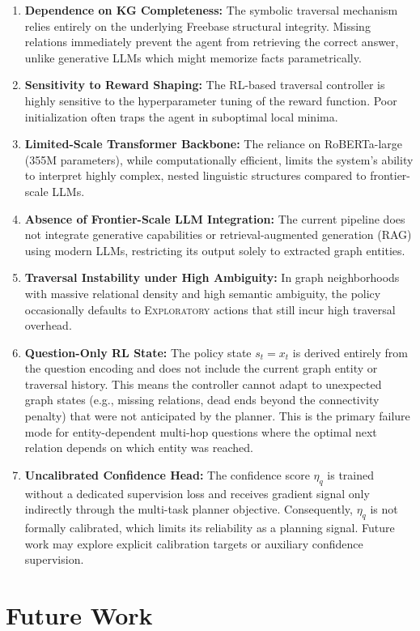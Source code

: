\documentclass[10pt,conference]{IEEEtran}
\begin{document}
\begin{enumerate}
\item \textbf{Dependence on KG Completeness:} The symbolic traversal mechanism relies entirely on the underlying Freebase structural integrity. Missing relations immediately prevent the agent from retrieving the correct answer, unlike generative LLMs which might memorize facts parametrically.
\item \textbf{Sensitivity to Reward Shaping:} The RL-based traversal controller is highly sensitive to the hyperparameter tuning of the reward function. Poor initialization often traps the agent in suboptimal local minima.
\item \textbf{Limited-Scale Transformer Backbone:} The reliance on RoBERTa-large (355M parameters), while computationally efficient, limits the system's ability to interpret highly complex, nested linguistic structures compared to frontier-scale LLMs.
\item \textbf{Absence of Frontier-Scale LLM Integration:} The current pipeline does not integrate generative capabilities or retrieval-augmented generation (RAG) using modern LLMs, restricting its output solely to extracted graph entities.
\item \textbf{Traversal Instability under High Ambiguity:} In graph neighborhoods with massive relational density and high semantic ambiguity, the policy occasionally defaults to \textsc{Exploratory} actions that still incur high traversal overhead.
\item \textbf{Question-Only RL State:} The policy state $s_t = x_t$ is derived entirely from the question encoding and does not include the current graph entity or traversal history. This means the controller cannot adapt to unexpected graph states (e.g., missing relations, dead ends beyond the connectivity penalty) that were not anticipated by the planner. This is the primary failure mode for entity-dependent multi-hop questions where the optimal next relation depends on which entity was reached.
\item \textbf{Uncalibrated Confidence Head:} The confidence score $\eta_q$ is trained without a dedicated supervision loss and receives gradient signal only indirectly through the multi-task planner objective. Consequently, $\eta_q$ is not formally calibrated, which limits its reliability as a planning signal. Future work may explore explicit calibration targets or auxiliary confidence supervision.
\end{enumerate}

\section{Future Work}
\end{document}
